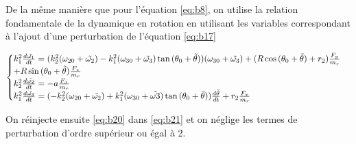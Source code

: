 De la même manière que pour l'équation \ref{eq:b8}, on utilise la relation fondamentale de la dynamique en rotation en utilisant les variables correspondant à l'ajout d'une perturbation de l'équation \ref{eq:b17}

\begin{equation}
  \begin{cases}
    k_1^2\frac{d\Tilde{\omega_1}}{dt} =(k_2^2(\omega_{20}+\Tilde{\omega_{2}})-k_1^2(\omega_{30}+\Tilde{\omega_3}) \tan{(\theta_0+\Tilde{\theta})})(\omega_{30}+\Tilde{\omega_3}) +(R\cos{(\theta_0+\Tilde{\theta})}+r_2)\frac{F_y}{m_r}\\
    + R\sin{(\theta_0+\Tilde{\theta})}\frac{F_z}{m_r} \\
    k_2^2\frac{d\Tilde{\omega_2}}{dt} =-a \frac{F_x}{m_r} \\
    k_1^2\frac{d\Tilde{\omega_3}}{dt} =(-k_2^2(\omega_{20}+\Tilde{\omega_2})+k_1^2(\omega_{30}+\Tilde{\omega3}) \tan{(\theta_0+\Tilde{\theta})})\frac{d\Tilde{\theta}}{dt} + r_2 \frac{F_x}{m_r}
  \end{cases}
  \label{eq:b21}
\end{equation}

On réinjecte ensuite \ref{eq:b20} dans \ref{eq:b21} et on néglige les termes de perturbation d'ordre supérieur ou égal à 2.

